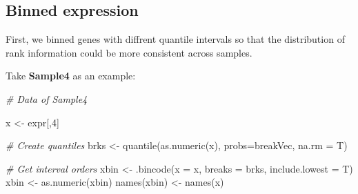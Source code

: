 \documentclass[
  12pt,
]{book}
\newenvironment{Shaded}{\begin{snugshade}}{\end{snugshade}}
\newcommand{\AttributeTok}[1]{\textcolor[rgb]{0.77,0.63,0.00}{#1}}
\newcommand{\CommentTok}[1]{\textcolor[rgb]{0.56,0.35,0.01}{\textit{#1}}}
\newcommand{\DecValTok}[1]{\textcolor[rgb]{0.00,0.00,0.81}{#1}}
\newcommand{\FunctionTok}[1]{\textcolor[rgb]{0.00,0.00,0.00}{#1}}
\newcommand{\NormalTok}[1]{#1}
\newcommand{\OtherTok}[1]{\textcolor[rgb]{0.56,0.35,0.01}{#1}}
\begin{document}
\hypertarget{binned-expression}{%
\subsection{Binned expression}\label{binned-expression}}

First, we binned genes with diffrent quantile intervals so that the distribution of rank information could be more consistent across samples.

Take \textbf{Sample4} as an example:

\begin{Shaded}
\begin{Highlighting}[]

\CommentTok{\# Data of Sample4}

\NormalTok{x }\OtherTok{\textless{}{-}}\NormalTok{ expr[,}\DecValTok{4}\NormalTok{]}

\CommentTok{\# Create quantiles  }
\NormalTok{brks }\OtherTok{\textless{}{-}} \FunctionTok{quantile}\NormalTok{(}\FunctionTok{as.numeric}\NormalTok{(x), }
                 \AttributeTok{probs=}\NormalTok{breakVec, }
                 \AttributeTok{na.rm =}\NormalTok{ T)}

\CommentTok{\# Get interval orders}
\NormalTok{xbin }\OtherTok{\textless{}{-}} \FunctionTok{.bincode}\NormalTok{(}\AttributeTok{x =}\NormalTok{ x, }
                 \AttributeTok{breaks =}\NormalTok{ brks, }
                 \AttributeTok{include.lowest =}\NormalTok{ T)}
\NormalTok{xbin }\OtherTok{\textless{}{-}} \FunctionTok{as.numeric}\NormalTok{(xbin)}
\FunctionTok{names}\NormalTok{(xbin) }\OtherTok{\textless{}{-}} \FunctionTok{names}\NormalTok{(x)}


\end{Highlighting}
\end{Shaded}
\end{document}
